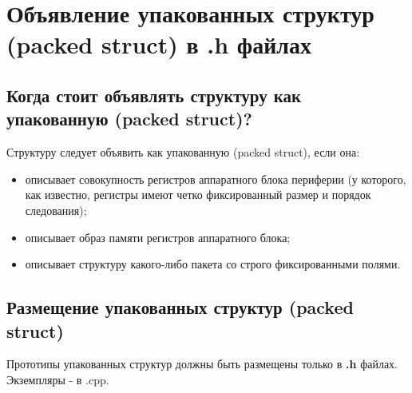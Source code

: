 \chapter{Объявление упакованных структур (packed struct) в .h файлах}\label{struct:p}
\section{Когда стоит объявлять структуру как упакованную (packed struct)?}
Структуру следует объявить как упакованную (packed struct), если она:
\begin{itemize}
	\item описывает совокупность регистров аппаратного блока периферии (у которого, как известно, регистры имеют четко фиксированный размер и порядок следования);
	\item описывает образ памяти регистров аппаратного блока;
	\item описывает структуру какого-либо пакета со строго фиксированными полями.
\end{itemize}

\section{Размещение упакованных структур (packed struct)}
Прототипы упакованных структур должны быть размещены только в \textbf{.h} файлах. Экземпляры - в .cpp.

